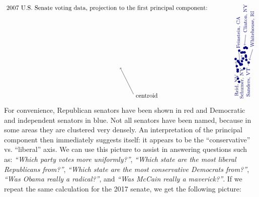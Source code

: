 \begin{equation*}
\begin{tikzpicture}[scale=0.75]
    \dataDy{Reid}{Harry}{D}{NV}{8.689703}{0.665197}{0.1}
    \dataD{Mikulski}{Barbara}{D}{MD}{8.776657}{0.129926}{0}
    \dataD{Wyden}{Ron}{D}{OR}{8.846398}{-0.272109}{0}
    \dataD{Leahy}{Patrick}{D}{VT}{8.853166}{-0.139810}{0}
    \dataD{Harkin}{Tom}{D}{IA}{8.859139}{0.517913}{0}
    \dataD{Klobuchar}{Amy}{D}{MN}{8.865049}{-0.814168}{0}
    \dataD{Murray}{Patty}{D}{WA}{8.923771}{0.434588}{0}
    \dataD{Akaka}{Daniel}{D}{HI}{8.955400}{-1.058981}{0}
    \dataD{Brown}{Sherrod}{D}{OH}{8.961322}{1.297369}{0}
    \dataDx{Feinstein}{Dianne}{D}{CA}{9.019263}{0.316944}{-0.1}
    \dataD{Bingaman}{Jeff}{D}{NM}{9.063834}{0.227690}{0}
    \dataDy{Schumer}{Charles}{D}{NY}{9.124474}{1.151808}{0.05}
    \dataD{Cardin}{Benjamin}{D}{MD}{9.154539}{0.261731}{0}
    \dataD{Kohl}{Herb}{D}{WI}{9.168217}{0.505190}{0}
    \dataD{Casey}{Bob}{D}{PA}{9.227674}{1.165228}{0}
    \dataD{Stabenow}{Debbie}{D}{MI}{9.259294}{0.701454}{0}
    \dataD{Reed}{John}{D}{RI}{9.328214}{-0.051071}{0}
    \dataDx{Clinton}{Hillary}{D}{NY}{9.345548}{1.498053}{0.1}
    \dataDy{Sanders}{Bernard}{I}{VT}{9.366115}{1.166931}{0.3}
    \dataD{Durbin}{Richard}{D}{IL}{9.450949}{1.549572}{0}
    \dataD{Lautenberg}{Frank}{D}{NJ}{9.458477}{0.934696}{0}
    \dataD{Levin}{Carl}{D}{MI}{9.464507}{0.830443}{0}
    \dataD{Menendez}{Robert}{D}{NJ}{9.493317}{0.599649}{0}
    \dataD{Boxer}{Barbara}{D}{CA}{9.537760}{1.490709}{0}
    \dataDx{Whitehouse}{Sheldon}{D}{RI}{9.675169}{0.398093}{0.3}
    \draw[->] (0,0) +(1,-2) node[right,yshift=-2] {centroid} -- +(0,0);
    \path (-1,4.5) node {2007 U.S. Senate voting data, projection to the first principal component:};
  \end{tikzpicture}
\end{equation*}
For convenience, Republican senators have been shown in red and
Democratic and independent senators in blue. Not all senators have
been named, because in some areas they are clustered very densely. An
interpretation of the principal component then immediately suggests
itself: it appears to be the ``conservative'' vs. ``liberal'' axis. We
can use this picture to assist in answering questions such as: {\em
  ``Which party votes more uniformly?''}, {\em ``Which state are the
  most liberal Republicans from?''}, {\em ``Which state are the most
  conservative Democrats from?''}, {\em ``Was Obama really a
  radical?''}, and {\em ``Was McCain really a maverick?''}.  If we
repeat the same calculation for the 2017 senate, we get the following
picture:
